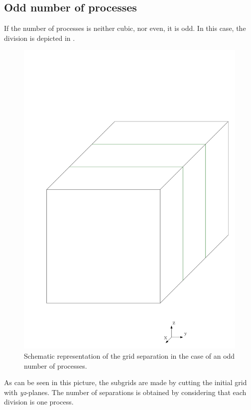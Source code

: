 \documentclass[12 pt]{article}
\begin{document}
\subsection{Odd number of processes}
If the number of processes is neither cubic, nor even, it is odd. In this case, the division is depicted in .
%
\begin{figure}
    \centering
    \includegraphics[scale=0.5]{MPI_impair_division}
    \caption{Schematic representation of the grid separation in the case of an odd number of processes.}
    \label{fig:ODDSEPARATION}
\end{figure}
%
As can be seen in this picture, the subgrids are made by cutting the initial grid with \textit{yz}-planes. The number of separations is obtained by considering that each division is one process.
\end{document}
